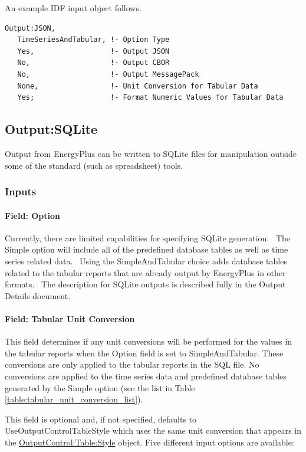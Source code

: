 An example IDF input object follows.
\begin{lstlisting}
Output:JSON,
   TimeSeriesAndTabular, !- Option Type
   Yes,                  !- Output JSON
   No,                   !- Output CBOR
   No,                   !- Output MessagePack
   None,                 !- Unit Conversion for Tabular Data
   Yes;                  !- Format Numeric Values for Tabular Data
\end{lstlisting}

\subsection{Output:SQLite}\label{outputsqlite}

Output from EnergyPlus can be written to SQLite files for manipulation outside some of the standard (such as spreadsheet) tools.

\subsubsection{Inputs}\label{inputs-12-014}

\paragraph{Field: Option}\label{field-option}

Currently, there are limited capabilities for specifying SQLite generation.~ The Simple option will include all of the predefined database tables as well as time series related data.~ Using the SimpleAndTabular choice adds database tables related to the tabular reports that are already output by EnergyPlus in other formats.~ The description for SQLite outputs is described fully in the Output Details document.

\paragraph{Field: Tabular Unit Conversion}\label{field-tabular-unit-conversion}

This field determines if any unit conversions will be performed for the values in the tabular reports when the Option field is set to SimpleAndTabular. These conversions are only applied to the tabular reports in the SQL file. No conversions are applied to the time series data and predefined database tables generated by the Simple option (see the list in Table \ref{table:tabular_unit_conversion_list}).

This field is optional and, if not specified, defaults to UseOutputControlTableStyle which uses the same unit conversion that appears in the   \hyperref[outputcontroltablestyle]{OutputControl:Table:Style}
 object. Five different input options are available:

